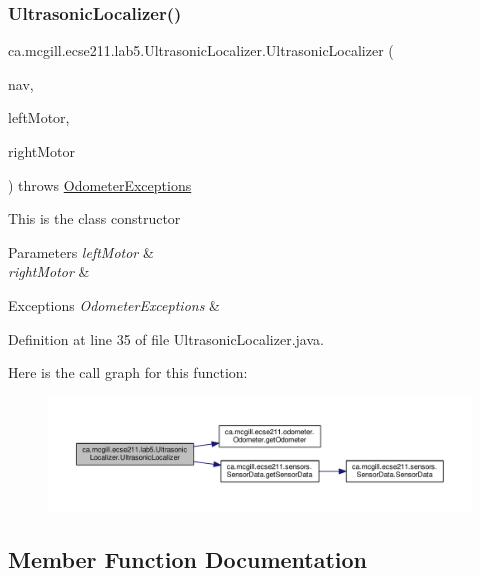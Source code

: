 \subsubsection{\texorpdfstring{Ultrasonic\+Localizer()}{UltrasonicLocalizer()}}
{\footnotesize\ttfamily ca.\+mcgill.\+ecse211.\+lab5.\+Ultrasonic\+Localizer.\+Ultrasonic\+Localizer (\begin{DoxyParamCaption}\item[{\hyperlink{classca_1_1mcgill_1_1ecse211_1_1lab5_1_1_navigation}{Navigation}}]{nav,  }\item[{E\+V3\+Large\+Regulated\+Motor}]{left\+Motor,  }\item[{E\+V3\+Large\+Regulated\+Motor}]{right\+Motor }\end{DoxyParamCaption}) throws \hyperlink{classca_1_1mcgill_1_1ecse211_1_1odometer_1_1_odometer_exceptions}{Odometer\+Exceptions}}

This is the class constructor


\begin{DoxyParams}{Parameters}
{\em left\+Motor} & \\
\hline
{\em right\+Motor} & \\
\hline
\end{DoxyParams}

\begin{DoxyExceptions}{Exceptions}
{\em Odometer\+Exceptions} & \\
\hline
\end{DoxyExceptions}


Definition at line 35 of file Ultrasonic\+Localizer.\+java.

Here is the call graph for this function\+:
\nopagebreak
\begin{figure}[H]
\begin{center}
\leavevmode
\includegraphics[width=350pt]{classca_1_1mcgill_1_1ecse211_1_1lab5_1_1_ultrasonic_localizer_a47c08f2d2ec2ba664867231ca62020da_cgraph}
\end{center}
\end{figure}


\subsection{Member Function Documentation}
\mbox{\label{classca_1_1mcgill_1_1ecse211_1_1lab5_1_1_ultrasonic_localizer_a7fd82ab7240a07ae6947313c0769d4bc}} 
